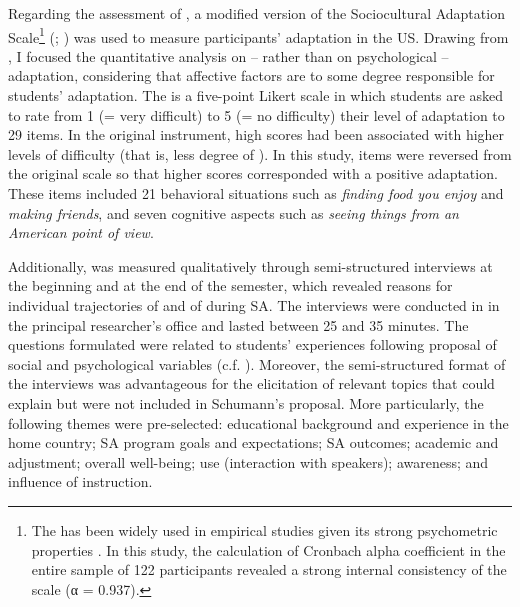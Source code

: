 \documentclass[output=paper]{langsci/langscibook}
\begin{document}
\largerpage
Regarding the assessment of , a modified version of the Sociocultural Adaptation Scale\footnote{The  has been widely used in empirical studies given its strong psychometric properties \citep{CelenkVanDeVijver2011}. In this study, the calculation of Cronbach alpha coefficient in the entire sample of 122 participants revealed a strong internal consistency of the scale (α = 0.937).} (; \citealt{WardKennedy1999}) was used to measure participants’  adaptation in the US. Drawing from \citet{Berry2003}, I focused the quantitative analysis on  – rather than on psychological – adaptation, considering that affective factors are to some degree responsible for students’  adaptation. The  is a five-point Likert scale in which students are asked to rate from 1 (= very difficult) to 5 (= no difficulty) their level of adaptation to 29 items. In the original instrument, high scores had been associated with higher levels of difficulty (that is, less degree of ). In this study, items were reversed from the original scale so that higher scores corresponded with a positive adaptation. These items included 21 behavioral situations such as \textit{finding food you enjoy} and \textit{making friends}, and seven cognitive aspects such as \textit{seeing things from an American point of view}.

Additionally,  was measured qualitatively through semi-struc\-tured interviews at the beginning and at the end of the semester, which revealed reasons for individual trajectories of  and of  during SA. The interviews were conducted in  in the principal researcher’s office and lasted between 25 and 35 minutes. The questions formulated were related to students’  experiences following  proposal of social and psychological  variables (c.f. ). Moreover, the semi-structured format of the interviews was advantageous for the elicitation of relevant topics that could explain  but were not included in Schumann’s proposal. More particularly, the following themes were pre-selected: educational background and  experience in the home country; SA program goals and expectations; SA outcomes; academic and  adjustment; overall well-being;  use (interaction with  speakers);  awareness; and influence of instruction.
\end{document}
